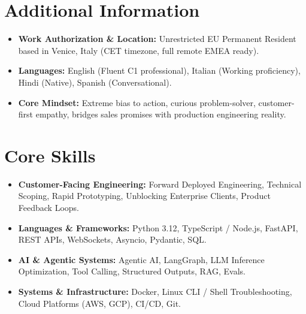 \documentclass[a4paper,10pt]{article}
\begin{document}
\section{Additional Information}
\begin{itemize}
  \item \textbf{Work Authorization \& Location:} Unrestricted EU Permanent Resident based in Venice, Italy (CET timezone, full remote EMEA ready).
  \item \textbf{Languages:} English (Fluent C1 professional), Italian (Working proficiency), Hindi (Native), Spanish (Conversational).
  \item \textbf{Core Mindset:} Extreme bias to action, curious problem-solver, customer-first empathy, bridges sales promises with production engineering reality.
\end{itemize}

\section{Core Skills}
\begin{itemize}
  \item \textbf{Customer-Facing Engineering:} Forward Deployed Engineering, Technical Scoping, Rapid Prototyping, Unblocking Enterprise Clients, Product Feedback Loops.
  \item \textbf{Languages \& Frameworks:} Python 3.12, TypeScript / Node.js, FastAPI, REST APIs, WebSockets, Asyncio, Pydantic, SQL.
  \item \textbf{AI \& Agentic Systems:} Agentic AI, LangGraph, LLM Inference Optimization, Tool Calling, Structured Outputs, RAG, Evals.
  \item \textbf{Systems \& Infrastructure:} Docker, Linux CLI / Shell Troubleshooting, Cloud Platforms (AWS, GCP), CI/CD, Git.
\end{itemize}
\end{document}
